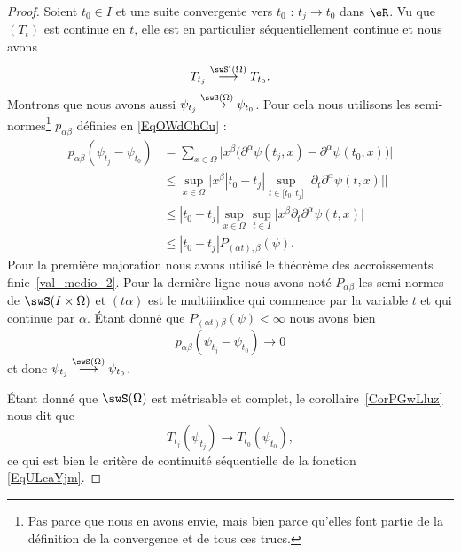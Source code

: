 \begin{proof}
    Soient \( t_0\in I\) et une suite convergente vers \( t_0\) : \( t_j\to t_0\) dans \( \eR\). Vu que \( (T_t)\) est continue en \( t\), elle est en particulier séquentiellement continue et nous avons
    \begin{equation}
        T_{t_j}\stackrel{\swS'(\Omega)}{\longrightarrow}T_{t_0}.
    \end{equation}
    Montrons que nous avons aussi \( \psi_{t_j}\stackrel{\swS(\Omega)}{\longrightarrow}\psi_{t_0}\). Pour cela nous utilisons les semi-normes\footnote{Pas parce que nous en avons envie, mais bien parce qu'elles font partie de la définition de la convergence et de tous ces trucs.} \( p_{\alpha\beta}\) définies en \eqref{EqOWdChCu} :
    \begin{subequations}
        \begin{align}
            p_{\alpha\beta}(\psi_{t_j}-\psi_{t_0})&=\sum_{x\in \Omega}\Big| x^{\beta}\big( \partial^{\alpha}\psi(t_j,x)-\partial^{\alpha}\psi(t_0,x) \big)       \Big|\\
            &\leq\sup_{x\in\Omega}\Big|  x^{\beta}| t_0-t_j |\sup_{t\in \mathopen[ t_0 , t_j \mathclose]}\big| \partial_t\partial^{\alpha}\psi(t,x) \big|   \Big|\\
            &\leq| t_0-t_j |\sup_{x\in\Omega}\sup_{t\in I}\big| x^{\beta}\partial_t\partial^{\alpha}\psi(t,x) \big|\\
            &\leq| t_0-t_j |P_{(\alpha t),\beta}(\psi).
        \end{align}
    \end{subequations}
    Pour la première majoration nous avons utilisé le théorème des accroissements finie~\ref{val_medio_2}. Pour la dernière ligne nous avons noté \( P_{\alpha\beta}\) les semi-normes de \( \swS(I\times \Omega)\) et \( (t\alpha)\) est le multiiindice qui commence par la variable \( t\) et qui continue par \( \alpha\). Étant donné que \( P_{(\alpha t)\beta}(\psi)<\infty\) nous avons bien
    \begin{equation}
        p_{\alpha\beta}(\psi_{t_j}-\psi_{t_0})\to 0
    \end{equation}
    et donc \( \psi_{t_j}\stackrel{\swS(\Omega)}{\longrightarrow}\psi_{t_0}\).

    Étant donné que \( \swS(\Omega)\) est métrisable et complet, le corollaire~\ref{CorPGwLluz} nous dit que
    \begin{equation}
        T_{t_j}(\psi_{t_j})\to T_{t_0}(\psi_{t_0}),
    \end{equation}
    ce qui est bien le critère de continuité séquentielle de la fonction \eqref{EqULcaYjm}.
\end{proof}

